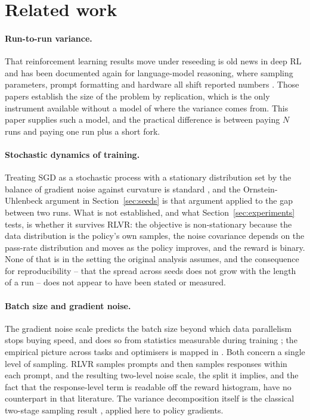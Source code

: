 \section{Related work}
\label{sec:related}

\paragraph{Run-to-run variance.} That reinforcement learning results move under reseeding is old
news in deep RL \citep{henderson2018matters} and has been documented again for language-model
reasoning, where sampling parameters, prompt formatting and hardware all shift reported numbers
\citep{hochlehnert2025sober}. Those papers establish the size of the problem by replication, which
is the only instrument available without a model of where the variance comes from. This paper
supplies such a model, and the practical difference is between paying $N$ runs and paying one run
plus a short fork.

\paragraph{Stochastic dynamics of training.} Treating SGD as a stochastic process with a stationary
distribution set by the balance of gradient noise against curvature is standard
\citep{mandt2017sgd}, and the Ornstein-Uhlenbeck argument in Section~\ref{sec:seeds} is that
argument applied to the gap between two runs. What is not established, and what
Section~\ref{sec:experiments} tests, is whether it survives RLVR: the objective is non-stationary
because the data distribution is the policy's own samples, the noise covariance depends on the
pass-rate distribution and moves as the policy improves, and the reward is binary. None of that is
in the setting the original analysis assumes, and the consequence for reproducibility -- that the
spread across seeds does not grow with the length of a run -- does not appear to have been stated
or measured.

\paragraph{Batch size and gradient noise.} The gradient noise scale predicts the batch size beyond
which data parallelism stops buying speed, and does so from statistics measurable during training
\citep{mccandlish2018empirical}; the empirical picture across tasks and optimisers is mapped in
\citet{shallue2019measuring}. Both concern a single level of sampling. RLVR samples prompts and then
samples responses within each prompt, and the resulting two-level noise scale, the split it implies,
and the fact that the response-level term is readable off the reward histogram, have no counterpart
in that literature. The variance decomposition itself is the classical two-stage sampling result
\citep{cochran1977sampling}, applied here to policy gradients.

